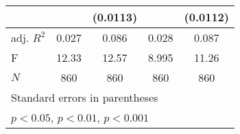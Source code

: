 {\begin{tabular}{l*{4}{c}}
            &                     &    (0.0113)         &                     &    (0.0112)         \\
\hline
adj. \(R^{2}\)&       0.027         &       0.086         &       0.028         &       0.087         \\
F           &       12.33         &       12.57         &       8.995         &       11.26         \\
\(N\)       &         860         &         860         &         860         &         860         \\
\hline\hline
\multicolumn{5}{l}{\footnotesize Standard errors in parentheses}\\
\multicolumn{5}{l}{\footnotesize \sym{*} \(p<0.05\), \sym{**} \(p<0.01\), \sym{***} \(p<0.001\)}\\
\end{tabular}
}

